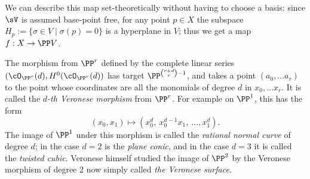 We can describe this map set-theoretically without having to choose a basis: since $\sV$ is assumed base-point free, for any point $p \in X$ the subspace $H_p := \{ \sigma \in V \mid \sigma(p) = 0 \}$ is a hyperplane in $V$; thus we get a map $f : X \to \PP V$.


%
%
%
%

\begin{example}\label{Veronese definition}
The morphism from $\PP^r$ defined by the complete linear series $(\cO_{\PP^r}(d), H^0(\cO_{\PP^r}(d))$ has target
$\PP^{{r+d\choose r}-1}$, and takes a point $(a_0,\dots a_r)$ to the point whose coordinates are all the monomials of
degree $d$ in $x_0,\dots x_r$. It is called the \emph{$d$-th Veronese morphism} from $\PP^r$. For example on $\PP^1$, this has the form
$$
(x_0,x_1) \mapsto (x_0^d,\ x_0^{d-1}x_1,\ \dots,x_1^d).
$$
The image of $\PP^1$ under this morphism is called the \emph{rational normal curve} of degree $d$; in the case $d=2$ is the
\emph{plane conic}, and in the case $d=3$ it is called the \emph{twisted cubic}. Veronese himself studied the image of $\PP^2$
by the Veronese morphism of degree 2 now simply called \emph{the Veronese surface}.
\end{example}





